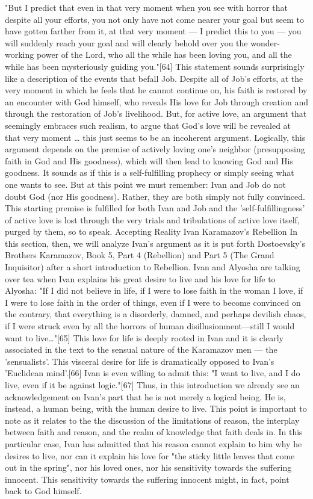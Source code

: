 "But I predict that even in that very moment when you see with horror that despite all your efforts, you not only have not come nearer your goal but seem to have gotten farther from it, at that very moment — I predict this to you — you will suddenly reach your goal and will clearly behold over you the wonder-working power of the Lord, who all the while has been loving you, and all the while has been mysteriously guiding you."[64]
This statement sounds surprisingly like a description of the events that befall Job. Despite all of Job's efforts, at the very moment in which he feels that he cannot continue on, his faith is restored by an encounter with God himself, who reveals His love for Job through creation and through the restoration of Job's livelihood. But, for active love, an argument that seemingly embraces such realism, to argue that God's love will be revealed at that very moment … this just seems to be an incoherent argument. Logically, this argument depends on the premise of actively loving one's neighbor (presupposing faith in God and His goodness), which will then lead to knowing God and His goodness. It sounds as if this is a self-fulfilling prophecy or simply seeing what one wants to see. But at this point we must remember: Ivan and Job do not doubt God (nor His goodness). Rather, they are both simply not fully convinced. This starting premise is fulfilled for both Ivan and Job and the 'self-fulfillingness' of active love is lost through the very trials and tribulations of active love itself, purged by them, so to speak.
Accepting Reality
Ivan Karamazov’s Rebellion
In this section, then, we will analyze Ivan's argument as it is put forth Dostoevsky's Brothers Karamazov, Book 5, Part 4 (Rebellion) and Part 5 (The Grand Inquisitor) after a short introduction to Rebellion. Ivan and Alyosha are talking over tea when Ivan explains his great desire to live and his love for life to Alyosha: 
"If I did not believe in life, if I were to lose faith in the woman I love, if I were to lose faith in the order of things, even if I were to become convinced on the contrary, that everything is a disorderly, damned, and perhaps devilish chaos, if I were struck even by all the horrors of human disillusionment—still I would want to live…"[65] 
This love for life is deeply rooted in Ivan and it is clearly associated in the text to the sensual nature of the Karamazov men — the 'sensualists'. This visceral desire for life is dramatically opposed to Ivan's 'Euclidean mind'.[66] Ivan is even willing to admit this: "I want to live, and I do live, even if it be against logic."[67] Thus, in this introduction we already see an acknowledgement on Ivan's part that he is not merely a logical being. He is, instead, a human being, with the human desire to live. This point is important to note as it relates to the the discussion of the limitations of reason, the interplay between faith and reason, and the realm of knowledge that faith deals in. In this particular case, Ivan has admitted that his reason cannot explain to him why he desires to live, nor can it explain his love for "the sticky little leaves that come out in the spring", nor his loved ones, nor his sensitivity towards the suffering innocent. This sensitivity towards the suffering innocent might, in fact, point back to God himself.
